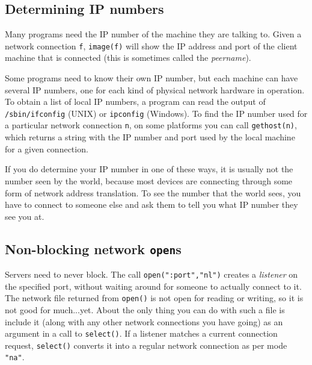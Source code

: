 \subsection*{Determining IP numbers}

Many programs need the IP number of the machine they are talking to. Given a
network connection {\texttt f}, \texttt{image(f)} will show the
IP address and port of the client machine that is connected (this is sometimes
called the \textit{peername}).

Some programs need to know their own IP number, but each machine can have
several IP numbers, one for each kind of physical network hardware in operation.
To obtain a list of local IP numbers, a program can read the output of
\texttt{/sbin/ifconfig} (UNIX) or \texttt{ipconfig} (Windows). To find the IP
number used for a particular network connection \texttt{n}, on some platforms
you can call \texttt{gethost(n)}, which returns a string with the IP number and
port used by the local machine for a given connection.

If you do determine your IP number in one of these ways, it is usually not the
number seen by the world, because most devices are connecting through some form
of network address translation.  To see the number that the world sees, you have
to connect to someone else and ask them to tell you what IP number they see you
at.


\subsection*{Non-blocking network \texttt{open}s}

Servers need to never block. The call
\texttt{open(":port","nl")}
creates a \textit{listener} on the specified port, without waiting around for
someone to actually connect to it. The network file returned from
\texttt{open()} is not open for reading or writing, so it is not good for
much...yet. About the only thing you can do with such a file is include it
(along with any other network connections you have going) as an argument in a
call to \texttt{select()}. If a listener matches a current connection request,
\texttt{select()} converts it into a regular network connection as per mode
\texttt{"na"}.

